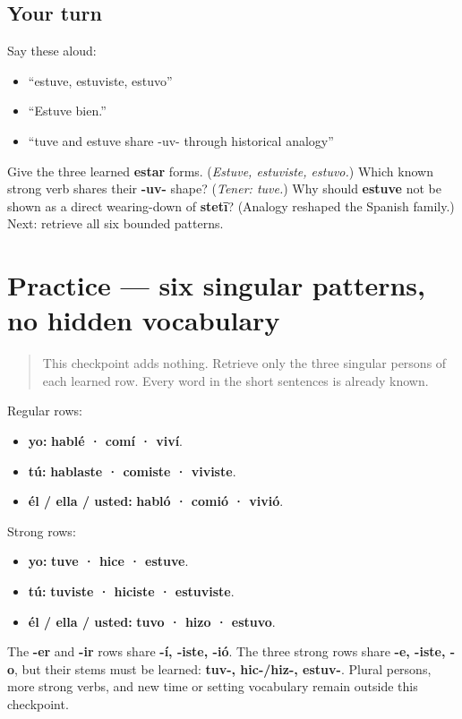 \subsection*{Your turn}
Say these aloud:

\begin{itemize}
\raggedright
  \item “estuve, estuviste, estuvo”
  \item “Estuve bien.”
  \item “tuve and estuve share -uv- through historical analogy”
\end{itemize}

\begin{tcolorbox}[breakable,colback=teal!4,colframe=teal!35!black,title={Before you move on}]
Give the three learned \textbf{estar} forms. (\emph{Estuve, estuviste, estuvo.}) Which known strong verb shares their \textbf{-uv-} shape? (\emph{Tener: tuve.}) Why should \textbf{estuve} not be shown as a direct wearing-down of \textbf{stetī}? (Analogy reshaped the Spanish family.) Next: retrieve all six bounded patterns.
\end{tcolorbox}
\section[Practice]{Practice — six singular patterns, no hidden vocabulary}

\label{lesson:ES-C15-practice}



\begin{quote}
This checkpoint adds nothing. Retrieve only the three singular persons of each learned row. Every word in the short sentences is already known.
\end{quote}

\begin{grammarlens}[title={Grammar Lens: the complete frame for this chapter}]
Regular rows:

\begin{itemize}
\raggedright
  \item \textbf{yo:} \textbf{hablé · comí · viví}.
  \item \textbf{tú:} \textbf{hablaste · comiste · viviste}.
  \item \textbf{él / ella / usted:} \textbf{habló · comió · vivió}.
\end{itemize}

Strong rows:

\begin{itemize}
\raggedright
  \item \textbf{yo:} \textbf{tuve · hice · estuve}.
  \item \textbf{tú:} \textbf{tuviste · hiciste · estuviste}.
  \item \textbf{él / ella / usted:} \textbf{tuvo · hizo · estuvo}.
\end{itemize}

The \textbf{-er} and \textbf{-ir} rows share \textbf{-í, -iste, -ió}. The three strong rows share \textbf{-e, -iste, -o}, but their stems must be learned: \textbf{tuv-, hic-/hiz-, estuv-}. Plural persons, more strong verbs, and new time or setting vocabulary remain outside this checkpoint.
\end{grammarlens}


